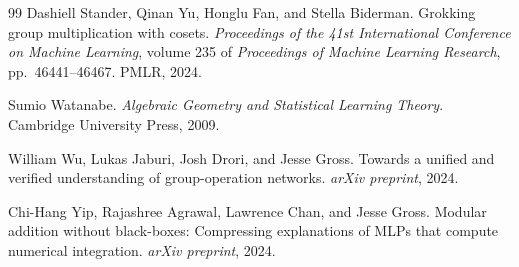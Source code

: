\documentclass[11pt,a4paper]{article}
\begin{document}
\begin{thebibliography}{99}
Dashiell Stander, Qinan Yu, Honglu Fan, and Stella Biderman.
\newblock Grokking group multiplication with cosets.
\newblock \emph{Proceedings of the 41st International Conference on Machine Learning}, volume 235 of \emph{Proceedings of Machine Learning Research}, pp.~46441--46467. PMLR, 2024.

Sumio Watanabe.
\newblock \emph{Algebraic Geometry and Statistical Learning Theory}.
\newblock Cambridge University Press, 2009.

William Wu, Lukas Jaburi, Josh Drori, and Jesse Gross.
\newblock Towards a unified and verified understanding of group-operation networks.
\newblock \emph{arXiv preprint}, 2024.

Chi-Hang Yip, Rajashree Agrawal, Lawrence Chan, and Jesse Gross.
\newblock Modular addition without black-boxes: Compressing explanations of {MLP}s that compute numerical integration.
\newblock \emph{arXiv preprint}, 2024.

\end{thebibliography}
\end{document}
